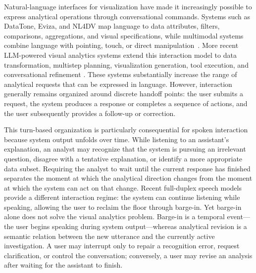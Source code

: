 \documentclass[journal]{IEEEtran}
\begin{document}
Natural-language interfaces for visualization have made it increasingly
possible to express analytical operations through conversational commands.
Systems such as DataTone, Eviza, and NL4DV map language to data attributes,
filters, comparisons, aggregations, and visual specifications, while
multimodal systems combine language with pointing, touch, or direct
manipulation~\cite{gao2015datatone,setlur2016eviza,
narechania2021nl4dv,srinivasan2018orko,srinivasan2020inchorus}.
More recent LLM-powered visual analytics systems extend this interaction model
to data transformation, multistep planning, visualization generation, tool
execution, and conversational refinement
\cite{dibia2023lida,wang2024dataformulator2,zhao2024lightva,
weng2025insightlens}. These systems substantially increase the range of
analytical requests that can be expressed in language. However, interaction
generally remains organized around discrete handoff points: the user submits a
request, the system produces a response or completes a sequence of actions,
and the user subsequently provides a follow-up or correction.

This turn-based organization is particularly consequential for spoken
interaction because system output unfolds over time. While listening to an
assistant's explanation, an analyst may recognize that the system is pursuing
an irrelevant question, disagree with a tentative explanation, or identify a
more appropriate data subset. Requiring the analyst to wait until the current
response has finished separates the moment at which the analytical direction
changes from the moment at which the system can act on that change. Recent
full-duplex speech models provide a different interaction regime: the system
can continue listening while speaking, allowing the user to reclaim the floor
through barge-in. Yet barge-in alone does not solve the visual analytics
problem. Barge-in is a temporal event---the user begins speaking during system
output---whereas analytical revision is a semantic relation between the new
utterance and the currently active investigation. A user may interrupt only to
repair a recognition error, request clarification, or control the conversation;
conversely, a user may revise an analysis after waiting for the assistant to
finish.
\end{document}
